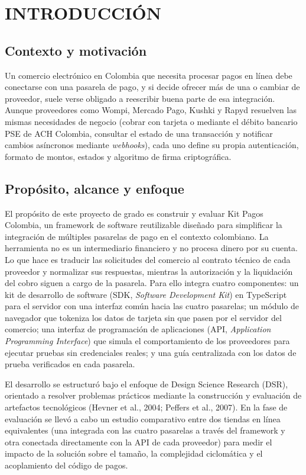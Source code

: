 \section{INTRODUCCIÓN}

\subsection{Contexto y motivación}

Un comercio electrónico en Colombia que necesita procesar pagos en línea debe conectarse con una pasarela de pago, y si decide ofrecer más de una o cambiar de proveedor, suele verse obligado a reescribir buena parte de esa integración. Aunque proveedores como Wompi, Mercado Pago, Kushki y Rapyd resuelven las mismas necesidades de negocio (cobrar con tarjeta o mediante el débito bancario PSE de ACH Colombia, consultar el estado de una transacción y notificar cambios asíncronos mediante \textit{webhooks}), cada uno define su propia autenticación, formato de montos, estados y algoritmo de firma criptográfica.

\subsection{Propósito, alcance y enfoque}

El propósito de este proyecto de grado es construir y evaluar Kit Pagos Colombia, un framework de software reutilizable diseñado para simplificar la integración de múltiples pasarelas de pago en el contexto colombiano. La herramienta no es un intermediario financiero y no procesa dinero por su cuenta. Lo que hace es traducir las solicitudes del comercio al contrato técnico de cada proveedor y normalizar sus respuestas, mientras la autorización y la liquidación del cobro siguen a cargo de la pasarela. Para ello integra cuatro componentes: un kit de desarrollo de software (SDK, \textit{Software Development Kit}) en TypeScript para el servidor con una interfaz común hacia las cuatro pasarelas; un módulo de navegador que tokeniza los datos de tarjeta sin que pasen por el servidor del comercio; una interfaz de programación de aplicaciones (API, \textit{Application Programming Interface}) que simula el comportamiento de los proveedores para ejecutar pruebas sin credenciales reales; y una guía centralizada con los datos de prueba verificados en cada pasarela.

El desarrollo se estructuró bajo el enfoque de Design Science Research (DSR), orientado a resolver problemas prácticos mediante la construcción y evaluación de artefactos tecnológicos (Hevner et al., 2004; Peffers et al., 2007). En la fase de evaluación se llevó a cabo un estudio comparativo entre dos tiendas en línea equivalentes (una integrada con las cuatro pasarelas a través del framework y otra conectada directamente con la API de cada proveedor) para medir el impacto de la solución sobre el tamaño, la complejidad ciclomática y el acoplamiento del código de pagos.
